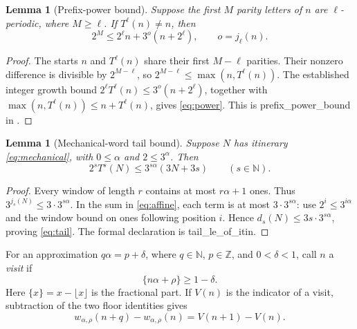 \documentclass[11pt]{article}
\newtheorem{lemma}[theorem]{Lemma}
\theoremstyle{remark}
\newcommand{\N}{\mathbb N}
\newcommand{\Z}{\mathbb Z}
\newcommand{\fr}[1]{\{#1\}}
\newcommand{\code}[1]{{\small\ttfamily #1}}
\begin{document}
\begin{lemma}[Prefix-power bound]\label{lem:power}
Suppose the first $M$ parity letters of $n$ are $\ell$-periodic, where
$M\ge\ell$. If $T^\ell(n)\ne n$, then
\begin{equation}\label{eq:power}
2^M\le 2^\ell n+3^o(n+2^\ell),\qquad o=j_\ell(n).
\end{equation}
\end{lemma}
\begin{proof}
The starts $n$ and $T^\ell(n)$ share their first $M-\ell$ parities.
Their nonzero difference is divisible by $2^{M-\ell}$, so
$2^{M-\ell}\le\max(n,T^\ell(n))$. The established integer growth bound
$2^\ell T^\ell(n)\le3^o(n+2^\ell)$, together with
$\max(n,T^\ell(n))\le n+T^\ell(n)$, gives \eqref{eq:power}.
This is \code{prefix\_\allowbreak{}power\_\allowbreak{}bound} in \cite{rung1}.
\end{proof}

\begin{lemma}[Mechanical-word tail bound]\label{lem:tail}
Suppose $N$ has itinerary \eqref{eq:mechanical}, with $0\le\alpha$ and
$2\le3^\alpha$. Then
\begin{equation}\label{eq:tail}
2^sT^s(N)\le3^{s\alpha}(3N+3s)\qquad(s\in\N).
\end{equation}
\end{lemma}
\begin{proof}
Every window of length $r$ contains at most $r\alpha+1$ ones. Thus
$3^{j_s(N)}\le3\cdot3^{s\alpha}$. In the sum in
\eqref{eq:affine}, each term is at most $3\cdot3^{s\alpha}$: use
$2^i\le3^{i\alpha}$ and the window bound on ones following position $i$.
Hence $d_s(N)\le3s\cdot3^{s\alpha}$, proving \eqref{eq:tail}.
The formal declaration is \code{tail\_\allowbreak{}le\_\allowbreak{}of\_\allowbreak{}itin}.
\end{proof}

For an approximation $q\alpha=p+\delta$, where $q\in\N$, $p\in\Z$,
and $0<\delta<1$, call $n$ a \emph{visit} if
\[
\fr{n\alpha+\rho}\ge1-\delta.
\]
Here $\fr{x}=x-\lfloor x\rfloor$ is the fractional part. If $V(n)$ is the
indicator of a visit, subtraction of the two floor identities gives
\begin{equation}\label{eq:shift}
w_{\alpha,\rho}(n+q)-w_{\alpha,\rho}(n)=V(n+1)-V(n).
\end{equation}
\end{document}
